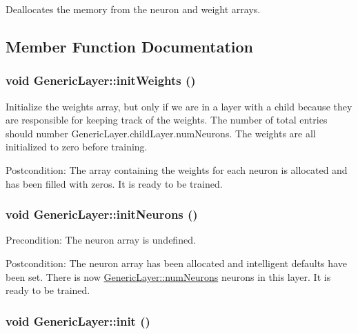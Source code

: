 Deallocates the memory from the neuron and weight arrays. 

\subsection{Member Function Documentation}
\hypertarget{classGenericLayer_2e2e170339c48bbcfe05afe9a1f60e43}{
\subsubsection{\setlength{\rightskip}{0pt plus 5cm}void GenericLayer::initWeights ()}}
\label{classGenericLayer_2e2e170339c48bbcfe05afe9a1f60e43}


Initialize the weights array, but only if we are in a layer with a child because they are responsible for keeping track of the weights. The number of total entries should number GenericLayer.childLayer.numNeurons. The weights are all initialized to zero before training. \begin{Desc}
\item[Postcondition:]The array containing the weights for each neuron is allocated and has been filled with zeros. It is ready to be trained. \end{Desc}
\hypertarget{classGenericLayer_c9357145e80d180b812df7bddeb5139d}{
\subsubsection{\setlength{\rightskip}{0pt plus 5cm}void GenericLayer::initNeurons ()}}
\label{classGenericLayer_c9357145e80d180b812df7bddeb5139d}


\begin{Desc}
\item[Precondition:]The neuron array is undefined. \end{Desc}
\begin{Desc}
\item[Postcondition:]The neuron array has been allocated and intelligent defaults have been set. There is now \hyperlink{classGenericLayer_7b45631903aa50e67fe5a1947fc292bd}{GenericLayer::numNeurons} neurons in this layer. It is ready to be trained. \end{Desc}
\hypertarget{classGenericLayer_716fbf0e6e01271f9ae648dcf1bcccd9}{
\subsubsection{\setlength{\rightskip}{0pt plus 5cm}void GenericLayer::init ()}}
\label{classGenericLayer_716fbf0e6e01271f9ae648dcf1bcccd9}



